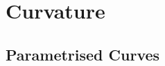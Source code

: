 \documentclass[12pt]{article}
\begin{document}
\section{Curvature}

\subsection{Parametrised Curves}


\end{document}
